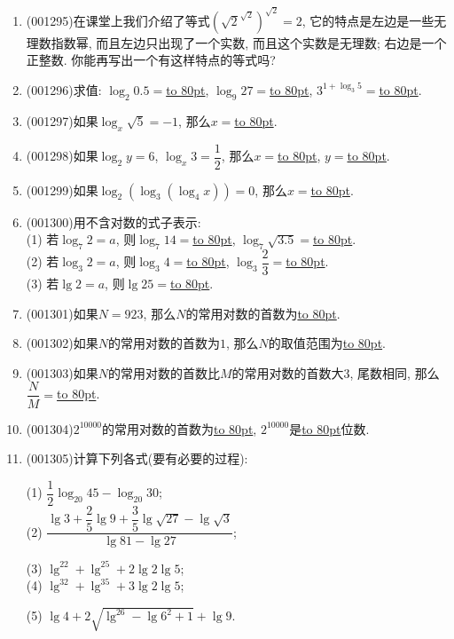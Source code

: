 \documentclass[10pt,a4paper]{article}
\newcommand{\blank}[1]{\underline{\hbox to #1pt{}}}
\begin{document}
\begin{enumerate}[1.]
\item {\tiny (001295)}在课堂上我们介绍了等式$\left(\sqrt{2}^{\sqrt{2}}\right)^{\sqrt{2}}=2$, 它的特点是左边是一些无理数指数幂, 而且左边只出现了一个实数, 而且这个实数是无理数; 右边是一个正整数. 你能再写出一个有这样特点的等式吗?
\item {\tiny (001296)}求值: $\log_2 0.5=$\blank{80}, $\log_9 27=$\blank{80}, $3^{1+\log_3 5}=$\blank{80}.
\item {\tiny (001297)}如果$\log_x\sqrt{5}=-1$, 那么$x=$\blank{80}.
\item {\tiny (001298)}如果$\log_2 y=6$, $\log_x 3=\dfrac{1}{2}$, 那么$x=$\blank{80}, $y=$\blank{80}.
\item {\tiny (001299)}如果$\log_2(\log_3(\log_4x))=0$, 那么$x=$\blank{80}.
\item {\tiny (001300)}用不含对数的式子表示:\\ 
(1) 若$\log_7 2=a$, 则$\log_7 14=$\blank{80}, $\log_7 \sqrt{3.5}=$\blank{80}.\\ 
(2) 若$\log_3 2=a$, 则$\log_3 4=$\blank{80}, $\log_3 \dfrac{2}{3}=$\blank{80}.\\ 
(3) 若$\lg 2=a$, 则$\lg 25=$\blank{80}.
\item {\tiny (001301)}如果$N=923$, 那么$N$的常用对数的首数为\blank{80}.
\item {\tiny (001302)}如果$N$的常用对数的首数为$1$, 那么$N$的取值范围为\blank{80}.
\item {\tiny (001303)}如果$N$的常用对数的首数比$M$的常用对数的首数大$3$, 尾数相同, 那么$\dfrac{N}{M}=$\blank{80}.
\item {\tiny (001304)}$2^{10000}$的常用对数的首数为\blank{80}, $2^{10000}$是\blank{80}位数.
\item {\tiny (001305)}计算下列各式(要有必要的过程):
\begin{multicols}{2}
(1) $\dfrac{1}{2}\log_{20}45-\log_{20}30$;\\ 
(2) $\dfrac{\lg3+\dfrac{2}{5}\lg9+\dfrac{3}{5}\lg\sqrt{27}-\lg\sqrt{3}}{\lg81-\lg27}$;\\ 
\end{multicols}
\begin{multicols}{2}
(3) $\lg^22+\lg^25+2\lg2\lg5$; \\ 
(4) $\lg^32+\lg^35+3\lg2\lg5$;\hfill\\ 
\end{multicols}
\begin{multicols}{2}
(5) $\lg4+2\sqrt{\lg^26-\lg6^2+1}+\lg9$.\\ 
\end{multicols}

\end{enumerate}
\end{document}

